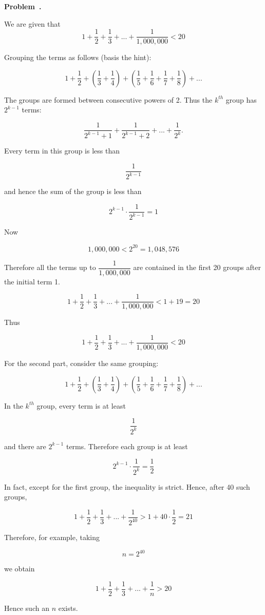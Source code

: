 \documentclass[10pt]{article}
\newcounter{problem}
\newenvironment{problem}[1][]{
  \refstepcounter{problem}
  \par\noindent\textbf{Problem~\theproblem. #1}\par
  \vspace{0.5em}
}{\vspace{1em}}
\begin{document}
\begin{problem} %
We are given that
\[
1 + \dfrac{1}{2} + \dfrac{1}{3} + ... +\dfrac{1}{1,000,000} < 20
\]

Grouping the terms as follows (basis the hint):

\[
1 + \dfrac{1}{2} + \left(\dfrac{1}{3} + \dfrac{1}{4}\right) + \left(\dfrac{1}{5} + \dfrac{1}{6} + \dfrac{1}{7} + \dfrac{1}{8}\right) + ...
\]

The groups are formed between consecutive powers of 2. Thus the $k^{th}$ group has $2^{k-1}$ terms:

\[
\dfrac{1}{2^{k-1}+1} + \dfrac{1}{2^{k-1}+2} + ... + \dfrac{1}{2^k}.
\]

Every term in this group is less than

\[
\dfrac{1}{2^{k-1}}
\]

and hence the sum of the group is less than

\[
2^{k-1} \cdot \dfrac{1}{2^{k-1}} = 1
\]

Now

\[
1,000,000<2^{20}=1,048,576
\]

Therefore all the terms up to $\dfrac{1}{1,000,000}$ are contained in the first 20 groups after the initial term 1. 

\[
1 + \dfrac{1}{2} + \dfrac{1}{3} + ... + \dfrac{1}{1,000,000} < 1 + 19 = 20
\]

Thus

\[
1 + \dfrac{1}{2} + \dfrac{1}{3} + ... + \dfrac{1}{1,000,000} < 20
\]

For the second part, consider the same grouping:

\[
1 + \dfrac{1}{2} + \left(\dfrac{1}{3} + \dfrac{1}{4}\right) + \left(\dfrac{1}{5} + \dfrac{1}{6} + \dfrac{1}{7} + \dfrac{1}{8}\right) + ...
\]

In the $k^{th}$ group, every term is at least

\[
\dfrac{1}{2^k}
\]

and there are $2^{k-1}$ terms. Therefore each group is at least

\[
2^{k-1} \cdot \dfrac{1}{2^k} = \dfrac{1}{2}
\]

In fact, except for the first group, the inequality is strict. Hence, after 40 such groups,

\[
1 + \dfrac{1}{2} + \dfrac{1}{3} + ... + \dfrac{1}{2^{40}} > 1 + 40 \cdot \dfrac{1}{2} = 21
\]

Therefore, for example, taking

\[
n =2^{40}
\]

we obtain

\[
1 + \dfrac{1}{2} + \dfrac{1}{3} + ... + \dfrac{1}{n} > 20
\]

Hence such an $n$ exists.
\end{problem}
\end{document}
